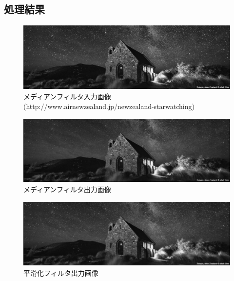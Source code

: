 \documentclass[11pt,a4j]{jsarticle}
\begin{document}
    \subsection{処理結果}
    \begin{figure}[H]
      \centering
      \includegraphics[clip,width=13.0cm ,height= 3.5cm]{./img/median/median_source.png}
      \caption{メディアンフィルタ入力画像(http://www.airnewzealand.jp/newzealand-starwatching)\label{fig:median_source}}
    \end{figure}
    \begin{figure}[H]
      \centering
      \includegraphics[clip,width=13.0cm ,height= 3.5cm]{./img/median/median.png}
      \caption{メディアンフィルタ出力画像\label{fig:median_result}}
    \end{figure}

    \begin{figure}[H]
      \centering
      \includegraphics[clip,width=13.0cm ,height= 3.5cm]{./img/median/smoothedconv.png}
      \caption{平滑化フィルタ出力画像\label{fig:median_result}}
    \end{figure}
\end{document}
